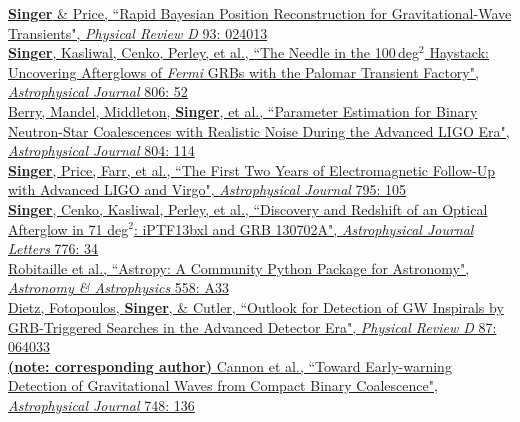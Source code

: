 \documentclass[10pt, letterpaper]{article} %
\newcommand{\years}[1]{\marginnote{\scriptsize #1}} %
\begin{document}
%
\years{2016}\href{http://dx.doi.org/10.1103/PhysRevD.93.024013}{\textbf{Singer} \& Price, “Rapid Bayesian Position Reconstruction for Gravitational-Wave Transients", \emph{Physical Review D} 93: 024013}\\[0.125cm]
%
%
\years{2015}\href{http://dx.doi.org/10.1088/0004-637X/806/1/52}{\textbf{Singer}, Kasliwal, Cenko, Perley, et al., “The Needle in the 100\,deg$^2$ Haystack: Uncovering Afterglows of \emph{Fermi} GRBs with the Palomar Transient Factory", \emph{Astrophysical Journal} 806: 52}\\[0.125cm]
%
\years{2015}\href{http://dx.doi.org/10.1088/0004-637X/804/2/114}{Berry, Mandel, Middleton, \textbf{Singer}, et al., “Parameter Estimation for Binary Neutron-Star Coalescences with Realistic Noise During the Advanced LIGO Era", \emph{Astrophysical Journal} 804: 114}\\[0.125cm]
%
\years{2014}\href{http://dx.doi.org/10.1088/0004-637X/795/2/105}{\textbf{Singer}, Price, Farr, et al., “The First Two Years of Electromagnetic Follow-Up with Advanced LIGO and Virgo", \emph{Astrophysical Journal} 795: 105}\\[0.125cm]
%
\years{2013}\href{http://dx.doi.org/10.1088/2041-8205/776/2/L34}{\textbf{Singer}, Cenko, Kasliwal, Perley, et al., “Discovery and Redshift of an Optical Afterglow in 71 deg$^2$: iPTF13bxl and GRB 130702A", \emph{Astrophysical Journal Letters} 776: 34}\\[0.125cm]
%
\years{2013}\href{http://dx.doi.org/10.1051/0004-6361/201322068}{Robitaille et al., “Astropy: A Community Python Package for Astronomy", \emph{Astronomy \& Astrophysics} 558: A33}\\[0.125cm]
%
\years{2013}\href{http://dx.doi.org/10.1103/PhysRevD.87.064033}{Dietz, Fotopoulos, \textbf{Singer}, \& Cutler, “Outlook for Detection of GW Inspirals by GRB-Triggered Searches in the Advanced Detector Era", \emph{Physical Review D} 87: 064033}\\[0.125cm]
%
\years{2012}\href{http://dx.doi.org/10.1088/0004-637X/748/2/136}{\textbf{(note: corresponding author)} Cannon et al., “Toward Early-warning Detection of Gravitational Waves from Compact Binary Coalescence", \emph{Astrophysical Journal} 748: 136}\\
\end{document}
